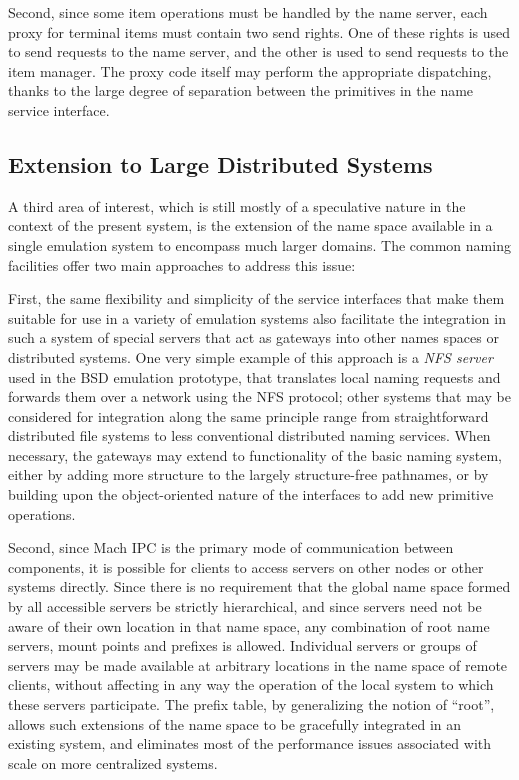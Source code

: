 Second, since some item operations must be handled by the name server,
each proxy for terminal items must contain two send rights. One of
these rights is used to send requests to the name server, and the
other is used to send requests to the item manager. The proxy code
itself may perform the appropriate dispatching, thanks to the large
degree of separation between the primitives in the name service
interface.

\subsection{Extension to Large Distributed Systems}

A third area of interest, which is still mostly of a speculative
nature in the context of the present system, is the extension of the
name space available in a single emulation system to encompass much
larger domains. The common naming facilities offer two main approaches
to address this issue:

First, the same flexibility and simplicity of the service interfaces
that make them suitable for use in a variety of emulation systems also
facilitate the integration in such a system of special servers that
act as gateways into other names spaces or distributed systems. One
very simple example of this approach is a {\em NFS server} used in the
BSD emulation prototype, that translates local naming requests and
forwards them over a network using the NFS protocol\cite{SUN86}; other
systems that may be considered for integration along the same
principle range from straightforward distributed file systems to less
conventional distributed naming services.  When necessary, the
gateways may extend to functionality of the basic naming system,
either by adding more structure to the largely structure-free
pathnames, or by building upon the object-oriented nature of the
interfaces to add new primitive operations.

Second, since Mach IPC is the primary mode of communication between
components, it is possible for clients to access servers on other
nodes or other systems directly.  Since there is no requirement that
the global name space formed by all accessible servers be strictly
hierarchical, and since servers need not be aware of their own
location in that name space, any combination of root name servers,
mount points and prefixes is allowed.  Individual servers or groups of
servers may be made available at arbitrary locations in the name space
of remote clients, without affecting in any way the operation of the
local system to which these servers participate. The prefix table, by
generalizing the notion of ``root'', allows such extensions of the
name space to be gracefully integrated in an existing system, and
eliminates most of the performance issues associated with scale on
more centralized systems.

